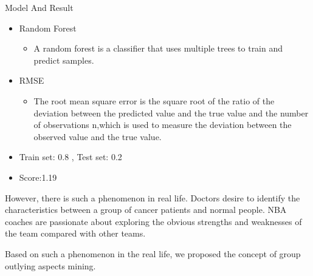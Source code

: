 \documentclass[
 size=12pt,
 paper=smartboard,  %
 mode=present, 		%
 display=slides, 	%
 style=tuliplab,  	%
 pauseslide,
 fleqn,leqno]{powerdot}
\begin{document}
\begin{slide}{Model And Result}
  \begin{itemize}
    \item
    Random Forest
    \begin{itemize}
      \item
      A random forest is a classifier that uses multiple trees to train and predict samples.
    \end{itemize}
    \item
    RMSE
    \begin{itemize}
      \item
      The root mean square error is the square root of the ratio of the deviation between the 
      predicted value and the true value and the number of observations n,which is used to 
      measure the deviation between the observed value and the true value.  
    \end{itemize}
    \item
    Train set: 0.8 , Test set: 0.2
    \item
    Score:1.19
  \end{itemize}
\begin{note}
However,
there is such a phenomenon in real life.
Doctors desire to identify the characteristics between
a group of cancer patients and normal people.
NBA coaches are passionate about exploring the obvious strengths and
weaknesses of the team compared with other teams.

Based on such a phenomenon in the real life,
we proposed the concept of group outlying aspects mining.
\end{note}
\end{slide}
\end{document}
